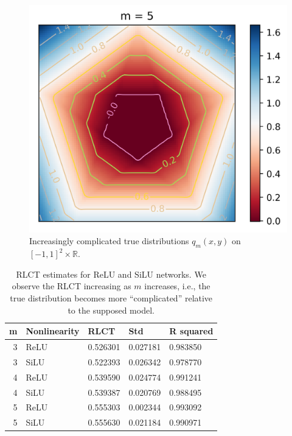 \documentclass{article} %
\begin{document}
\begin{figure}[h]
\begin{center}
\includegraphics[scale=0.35]{truedist5.png}
\end{center}
\caption{Increasingly complicated true distributions $q_m(x,y)$ on $[-1,1]^2 \times \mathbb{R}$.}
\label{fig:simp_func_complex}
\end{figure}

\begin{table}[h]
	\centering
	\caption{\footnotesize RLCT estimates for ReLU and SiLU networks. We observe the RLCT increasing as $m$ increases, i.e., the true distribution becomes more ``complicated'' relative to the supposed model.}
	\label{table:hyper}
    \begin{tiny}
    \begin{tabular}
    {r l l l l}
    \toprule
      \textbf{m}  & \textbf{Nonlinearity}  & \textbf{RLCT} & \textbf{Std} & \textbf{R squared}\\ 
    \midrule
    3 & ReLU & 0.526301 & 0.027181 & 0.983850\\
    3 & SiLU & 0.522393 & 0.026342 & 0.978770\\
    \hline
    4 & ReLU & 0.539590 & 0.024774 & 0.991241\\
    4 & SiLU & 0.539387 & 0.020769 & 0.988495\\
    \hline
    5 & ReLU & 0.555303 & 0.002344 & 0.993092\\
    5 & SiLU & 0.555630 & 0.021184 & 0.990971\\
   \bottomrule
   \end{tabular}
	\end{tiny}
\end{table}
\end{document}
